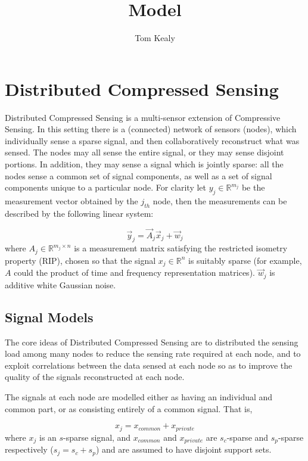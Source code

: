\documentclass{article}
\newcommand{\re}{{\mathbb{R}}}
\begin{document}
\title{Model}
\author{Tom Kealy}



\maketitle

\section{Distributed Compressed Sensing}
Distributed Compressed Sensing is a multi-sensor extension of Compressive Sensing. In this setting there is a (connected) network of sensors (nodes), which individually sense a sparse signal, and then collaboratively reconstruct what was sensed. The nodes may all sense the entire signal, or they may sense disjoint portions. In addition, they may sense a signal which is jointly sparse: all the nodes sense a common set of signal components, as well as a set of signal components unique to a particular node. For clarity let \(y_j \in \re^{m_j}\) be the measurement vector obtained by the \(j_{th}\) node, then the measurements can be described by the following linear system:

\begin{equation}
\vec{y}_j = \vec{A}_j \vec{x}_j + \vec{w}_j
\end{equation}
where \(A_j \in \re^{m_j \times n}\) is a measurement matrix satisfying the restricted isometry property (RIP), chosen so that the signal \(x_j \in \re^n\) is suitably sparse (for example, \(A\) could the product of time and frequency representation matrices). \(\vec{w}_j\) is additive white Gaussian noise. 

\subsection{Signal Models}
The core ideas of Distributed Compressed Sensing are to distributed the sensing load among many nodes to reduce the sensing rate required at each node, and to exploit correlations between the data sensed at each node so as to improve the quality of the signals reconstructed at each node. 

The signals at each node are modelled either as having an individual and common part, or as consisting entirely of a common signal. That is,

\begin{equation}
x_j = x_{common} + x_{private}
\end{equation}
where \(x_j\) is an \(s\)-sparse signal, and \(x_{common}\) and \(x_{private}\) are \(s_c\)-sparse and \(s_p\)-sparse respectively (\(s_j = s_c + s_p\)) and are assumed to have disjoint support sets.
\end{document}
